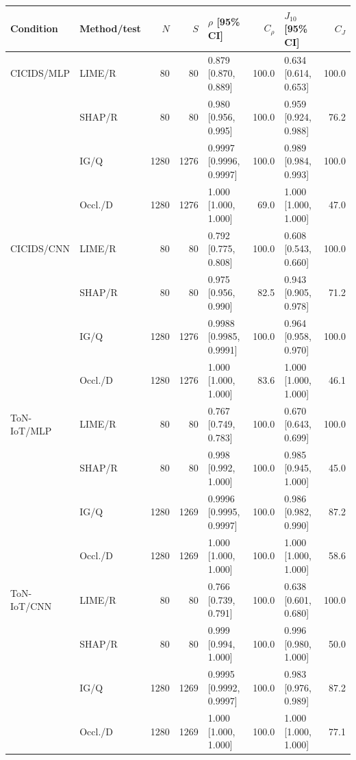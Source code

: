 \begin{tabular}{llrrlrlr}
\toprule
Condition & Method/test & $N$ & $S$ & $\rho$ [95\% CI] & $C_\rho$ & $J_{10}$ [95\% CI] & $C_J$ \\
\midrule
CICIDS/MLP & LIME/R & 80 & 80 & 0.879 [0.870, 0.889] & 100.0 & 0.634 [0.614, 0.653] & 100.0 \\
 & SHAP/R & 80 & 80 & 0.980 [0.956, 0.995] & 100.0 & 0.959 [0.924, 0.988] & 76.2 \\
 & IG/Q & 1280 & 1276 & 0.9997 [0.9996, 0.9997] & 100.0 & 0.989 [0.984, 0.993] & 100.0 \\
 & Occl./D & 1280 & 1276 & 1.000 [1.000, 1.000] & 69.0 & 1.000 [1.000, 1.000] & 47.0 \\
\midrule
CICIDS/CNN & LIME/R & 80 & 80 & 0.792 [0.775, 0.808] & 100.0 & 0.608 [0.543, 0.660] & 100.0 \\
 & SHAP/R & 80 & 80 & 0.975 [0.956, 0.990] & 82.5 & 0.943 [0.905, 0.978] & 71.2 \\
 & IG/Q & 1280 & 1276 & 0.9988 [0.9985, 0.9991] & 100.0 & 0.964 [0.958, 0.970] & 100.0 \\
 & Occl./D & 1280 & 1276 & 1.000 [1.000, 1.000] & 83.6 & 1.000 [1.000, 1.000] & 46.1 \\
\midrule
ToN-IoT/MLP & LIME/R & 80 & 80 & 0.767 [0.749, 0.783] & 100.0 & 0.670 [0.643, 0.699] & 100.0 \\
 & SHAP/R & 80 & 80 & 0.998 [0.992, 1.000] & 100.0 & 0.985 [0.945, 1.000] & 45.0 \\
 & IG/Q & 1280 & 1269 & 0.9996 [0.9995, 0.9997] & 100.0 & 0.986 [0.982, 0.990] & 87.2 \\
 & Occl./D & 1280 & 1269 & 1.000 [1.000, 1.000] & 100.0 & 1.000 [1.000, 1.000] & 58.6 \\
\midrule
ToN-IoT/CNN & LIME/R & 80 & 80 & 0.766 [0.739, 0.791] & 100.0 & 0.638 [0.601, 0.680] & 100.0 \\
 & SHAP/R & 80 & 80 & 0.999 [0.994, 1.000] & 100.0 & 0.996 [0.980, 1.000] & 50.0 \\
 & IG/Q & 1280 & 1269 & 0.9995 [0.9992, 0.9997] & 100.0 & 0.983 [0.976, 0.989] & 87.2 \\
 & Occl./D & 1280 & 1269 & 1.000 [1.000, 1.000] & 100.0 & 1.000 [1.000, 1.000] & 77.1 \\
\bottomrule
\end{tabular}
